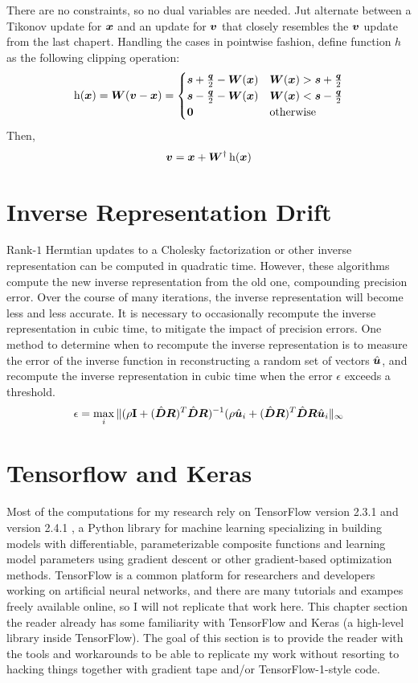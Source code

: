There are no constraints, so no dual variables are needed. Jut alternate between a Tikonov update for $\bm{x}$ and an update for $\bm{v}$ that closely resembles the $\bm{v}$ update from the last chapert.
Handling the cases in pointwise fashion, define function $h$ as the following clipping operation:
%
\begin{equation}
\operatorname{h}(\bm{x}) = \bm{W}(\bm{v} - \bm{x}) = \begin{cases} \bm{s} + \frac{\bm{q}}{2} - \bm{W}(\bm{x}) & \bm{W}(\bm{x}) > \bm{s} + \frac{\bm{q}}{2} \\ \bm{s} - \frac{\bm{q}}{2} - \bm{W}(\bm{x}) & \bm{W}(\bm{x}) < \bm{s} - \frac{\bm{q}}{2} \\ \bm{0} & \text{otherwise}
\end{cases}
\end{equation}
%
Then,
\begin{equation}
\bm{v} = \bm{x} + \bm{W}^{\dagger}\operatorname{h}(\bm{x})
\end{equation}

\section{Inverse Representation Drift}
Rank-$1$ Hermtian updates to a Cholesky factorization or other inverse representation can be computed in quadratic time. However, these algorithms compute the new inverse representation from the old one, compounding precision error. Over the course of many iterations, the inverse representation will become less and less accurate. It is necessary to occasionally recompute the inverse representation in cubic time, to mitigate the impact of precision errors.  One method to determine when to recompute the inverse representation is to measure the error of the inverse function in reconstructing a random set of vectors $\hat{\bm{u}}$, and recompute the inverse representation in cubic time when the error $\epsilon$ exceeds a threshold.
%
\begin{equation}
\epsilon = \max_i \|(\rho{\bf I} + (\hat{\bm{D}}\bm{R})^T\hat{\bm{D}}\bm{R})^{-1}(\rho\hat{\bm{u}}_i + (\hat{\bm{D}}\bm{R})^T\hat{\bm{D}}\bm{R}\hat{\bm{u}}_i\|_{\infty}
\end{equation} 

\section{Tensorflow and Keras}
Most of the computations for my research rely on TensorFlow version 2.3.1 and version 2.4.1 \cite{tensorflow}, a Python library for machine learning specializing in building models with differentiable, parameterizable composite functions and learning model parameters using gradient descent or other gradient-based optimization methods. TensorFlow is a common platform for researchers and developers working on artificial neural networks, and there are many tutorials and exampes freely available online, so I will not replicate that work here. This chapter section the reader already has some familiarity with TensorFlow and Keras \cite{keras} (a high-level library inside TensorFlow). The goal of this section is to provide the reader with the tools and workarounds to be able to replicate my work without resorting to hacking things together with gradient tape and/or TensorFlow-1-style code.

